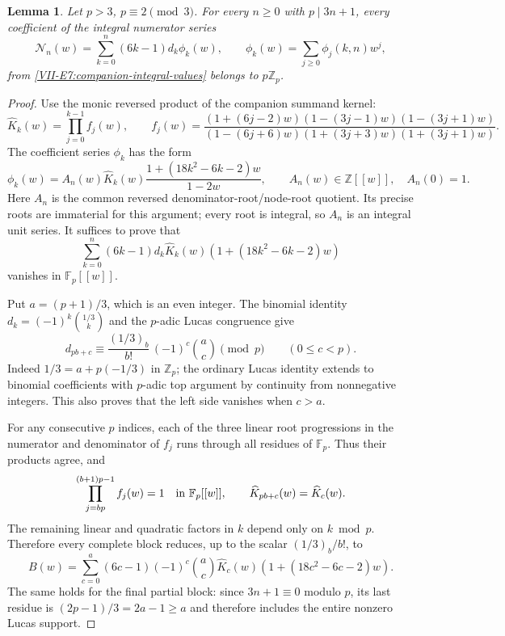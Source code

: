 \documentclass[11pt,letterpaper]{article}
\newtheorem{lemma}[theorem]{Lemma}
\numberwithin{equation}{section}
\begin{document}
\begin{lemma}\label{VII-lem:e-companion-numerator-gain}
Let $p>3$, $p\equiv2\pmod3$. For every $n\ge0$ with
$p\mid3n+1$, every coefficient of the integral numerator series
\[
 \mathcal N_n(w)=\sum_{k=0}^n(6k-1)d_k\phi_k(w),
 \qquad \phi_k(w)=\sum_{j\ge0}\phi_j(k,n)w^j,
\]
from \eqref{VII-E7:companion-integral-values} belongs to $p\mathbb Z_p$.
\end{lemma}
\begin{proof}
Use the monic reversed product of the companion summand kernel:
\[
 \widehat K_k(w)=\prod_{j=0}^{k-1} f_j(w),\qquad
 f_j(w)=
 \frac{(1+(6j-2)w)(1-(3j-1)w)(1-(3j+1)w)}
 {(1-(6j+6)w)(1+(3j+3)w)(1+(3j+1)w)}.
\]
The coefficient series $\phi_k$ has the form
\[
 \phi_k(w)=A_n(w)\widehat K_k(w)
                \frac{1+(18k^2-6k-2)w}{1-2w},
 \qquad A_n(w)\in\mathbb Z[[w]],\quad A_n(0)=1.
\]
Here $A_n$ is the common reversed denominator-root/node-root
quotient. Its precise roots are immaterial for this argument;
every root is integral, so $A_n$ is an integral unit series.
It suffices to prove that
\[
 \sum_{k=0}^n(6k-1)d_k\widehat K_k(w)
                       (1+(18k^2-6k-2)w)
\]
vanishes in $\mathbb F_p[[w]]$.

Put $a=(p+1)/3$, which is an even integer. The binomial identity
$d_k=(-1)^k\binom{1/3}{k}$ and the $p$-adic Lucas congruence give
\begin{equation}\label{VII-eq:e-companion-lucas}
 d_{pb+c}\equiv
 \frac{(1/3)_b}{b!}\,(-1)^c\binom ac\pmod p
 \qquad(0\le c<p).
\end{equation}
Indeed $1/3=a+p(-1/3)$ in $\mathbb Z_p$; the ordinary Lucas
identity extends to binomial coefficients with $p$-adic top argument
by continuity from nonnegative integers. This also proves that the
left side vanishes when $c>a$.

For any consecutive $p$ indices, each of the three linear root
progressions in the numerator and denominator of $f_j$ runs through
all residues of $\mathbb F_p$. Thus their products agree, and
\[
 \prod_{j=b p}^{(b+1)p-1}f_j(w)=1
       \quad\hbox{in }\mathbb F_p[[w]],
 \qquad \widehat K_{pb+c}(w)=\widehat K_c(w).
\]
The remaining linear and quadratic factors in $k$ depend only on
$k\bmod p$. Therefore every complete block reduces, up to the scalar
$(1/3)_b/b!$, to
\[
 B(w)=\sum_{c=0}^a(6c-1)(-1)^c\binom ac\widehat K_c(w)
                       (1+(18c^2-6c-2)w).
\]
The same holds for the final partial block: since $3n+1\equiv0$
modulo $p$, its last residue is $(2p-1)/3=2a-1\ge a$ and
therefore includes the entire nonzero Lucas support.


\end{proof}
\end{document}
